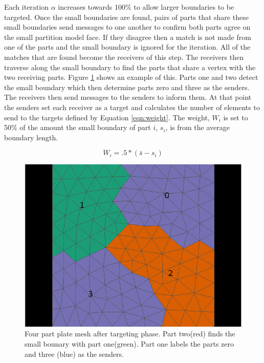\documentclass{thesis}
\begin{document}
Each iteration $\alpha$ increases towards 100\% to allow larger boundaries to 
be targeted. Once the small boundaries are found, pairs of parts that share 
these small boundaries send messages to one another to confirm both parts 
agree on the small partition model face. If they disagree then a match is 
not made from one of the parts and the small boundary is ignored for the 
iteration. All of the matches 
that are found become the receivers of this step. The receivers then 
traverse along the small boundary to find the parts that share a vertex 
with the two receiving parts. Figure \ref{fig:boundary} shows an example 
of this. Parts one and two detect the small boundary which then determine 
parts zero and three as the senders. The receivers then send messages to the 
senders to inform them. At that point the senders set each receiver as a 
target and calculates the number of elements to send to the targets defined 
by Equation \ref{eqn:weight}. The weight, $W_i$ is set to 50\% of the amount the small boundary of part $i$, $s_i$, is from the average boundary length. %

\begin{equation}
\label{eqn:weight}
W_i = .5*(\bar{s}-s_i)
\end{equation}  

\begin{figure} [!h]
\centering
\captionsetup{justification=centering,margin=1cm}
\includegraphics[width=.6\textwidth]{target_example.png}
\caption{\label{fig:boundary} \textnormal{Four part plate mesh after targeting phase. Part two(red) finds the small bounary with part one(green). Part one labels the parts zero and three (blue) as the senders.}}
\end{figure}
\end{document}
